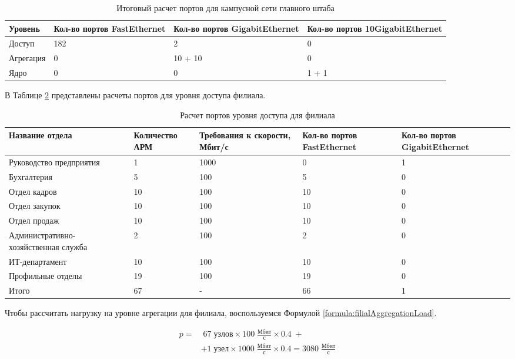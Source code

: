 \documentclass[14pt, a4paper]{extarticle}
\numberwithin{equation}{section}
\begin{document}
\begin{table}[H]
\centering
\small
\caption{Итоговый расчет портов для кампусной сети главного штаба}
\label{table:mainDepCampusNet}
\begin{tabular}{|m{2cm}|m{4cm}|m{3cm}|m{3.5cm}|}
\hline
\textbf{Уровень} & \textbf{Кол-во портов FastEthernet} & \textbf{Кол-во портов GigabitEthernet} & \textbf{Кол-во портов 10GigabitEthernet} \\
\hline
Доступ & 182 & 2 & 0 \\
\hline
Агрегация & 0 & 10 + 10 & 0 \\
\hline
Ядро & 0 & 0 & 1 + 1 \\
\hline
\end{tabular}
\end{table}


        

В Таблице \ref{table:filialAccessLevel} представлены расчеты портов для уровня доступа 
филиала.

\begin{table}[H]
\centering
\small
\caption{Расчет портов уровня доступа для филиала}
\label{table:filialAccessLevel}
\begin{tabular}{|m{4cm}|m{2.5cm}|m{2.5cm}|m{2.5cm}|m{3cm}|}
\hline
\textbf{Название отдела} & \textbf{Количество АРМ} & \textbf{Требования к скорости, Мбит/с} & \textbf{Кол-во портов FastEthernet} & \textbf{Кол-во портов GigabitEthernet} \\
\hline
Руководство предприятия & 1 & 1000 & 0 & 1 \\
\hline
Бухгалтерия & 5 & 100 & 5 & 0 \\
\hline
Отдел кадров & 10 & 100 & 10 & 0 \\
\hline
Отдел закупок & 10 & 100 & 10 & 0 \\
\hline
Отдел продаж & 10 & 100 & 10 & 0 \\
\hline
Административно-хозяйственная служба & 2 & 100 & 2 & 0 \\
\hline
ИТ-департамент & 10 & 100 & 10 & 0 \\
\hline
Профильные отделы & 19 & 100 & 19 & 0 \\
\hline
Итого & 67 & - & 66 & 1 \\
\hline
\end{tabular}
\end{table}

Чтобы рассчитать нагрузку на уровне агрегации для 
филиала, воспользуемся Формулой \ref{formula:filialAggregationLoad}.

\begin{equation}
\begin{aligned}
p = & \; 67 \; \text{узлов} \times 100\;\frac{\text{Мбит}}{\text{с}} \times 0.4 \; + \\
& + 1 \; \text{узел} \times 1000\;\frac{\text{Мбит}}{\text{с}} \times 0.4 = 3080\;\frac{\text{Мбит}}{\text{с}}
\end{aligned}
\label{formula:filialAggregationLoad}
\end{equation}
\end{document}
